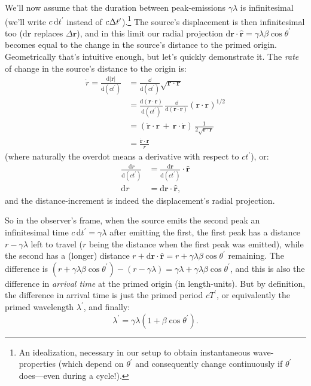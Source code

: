 \documentclass[12pt]{article}
\renewcommand{\vv}[1]{\mathbf{#1}}
\newcommand{\dd}[1]{\mathrm{d}#1}
\begin{document}
We'll now assume that the duration between peak-emissions $\gamma \lambda$ is infinitesimal (we'll write $c \, \dd t^\prime$ instead of $c \mkern.5mu \Delta t^\prime$).\footnote{An idealization, necessary in our setup to obtain instantaneous wave-properties (which depend on $\theta^\prime$ and consequently change continuously if $\theta^\prime$ does---even during a cycle!).} The source's displacement is then infinitesimal too ($\dd \vv r$ replaces $\Delta \vv r$), and in this limit our radial projection $\dd \vv r \cdot \vv{\hat{r}} = \gamma \lambda \beta \cos \theta^\prime$ becomes equal to the change in the source's distance to the primed origin. Geometrically that's intuitive enough, but let's quickly demonstrate it. The \emph{rate} of change in the source's distance to the origin is:
\begin{equation*}
\begin{aligned}
\dot{r} = \frac{\dd \vert \vv r \vert}{\dd (ct ^\prime)} &= \frac{\dd}{\dd (ct ^\prime)} \sqrt{ \vv r \cdot \vv r } \\[4pt]
&=  \frac{\dd (\vv r \cdot \vv r)}{\dd (ct^\prime)} \, \frac{\dd}{\dd (\vv r \cdot \vv r)} \left( \vv r \cdot \vv r \right) ^{1/2} \\
&=\left( \dot{\vv r} \cdot \vv r  \, + \, \vv r \cdot \dot{\vv r} \right) \, \frac{1}{2 \sqrt{\vv r \cdot \vv r}} \\
&= \frac{ \dot{\vv r} \cdot \vv r }{r}
\end{aligned}
\end{equation*}
(where naturally the overdot means a derivative with respect to $ct^\prime$), or:
\begin{equation*}
\begin{split}
\frac{\dd r}{\dd (ct ^\prime)} &= \frac{\dd \vv r}{\dd (ct ^\prime)} \cdot \vv{ \hat r } \\[5pt]
\dd r &= \dd \vv r \cdot \vv{\hat r},
\end{split}
\end{equation*}
and the distance-increment is indeed the displacement's radial projection.

So in the observer's frame, when the source emits the second peak an infinitesimal time $c \, \dd t^\prime = \gamma \lambda$ after emitting the first, the first peak has a distance $r - \gamma \lambda$ left to travel ($r$ being the distance when the first peak was emitted), while the second has a (longer) distance ${r + \dd \vv r \cdot \vv{\hat{r}} = r + \gamma \lambda \beta \cos \theta^\prime}$ remaining. The difference is ${(r + \gamma \lambda \beta \cos \theta^\prime) - (r - \gamma \lambda) = \gamma \lambda + \gamma \lambda \beta \cos \theta^\prime}$, and this is also the difference in \emph{arrival time} at the primed origin (in length-units). But by definition, the difference in arrival time is just the primed period $cT^\prime$, or equivalently the primed wavelength $\lambda^\prime$, and finally:
\begin{equation*}
\lambda^\prime = \gamma \lambda \left( 1 + \beta \cos \theta^\prime \right).
\end{equation*}
\end{document}
